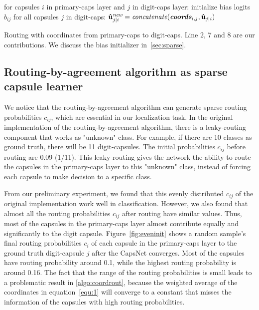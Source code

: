\documentclass{article}
\begin{document}
\begin{algorithm}
\SetAlgoLined
{}
 for capsules $i$ in primary-caps layer and $j$ in digit-caps layer: initialize bias logits $b_{ij}$ \;
 for all capsules $j$ in digit-caps: $\bold{\hat{u}}^{\small{\textit{new}}}_{j|i} = \textit{concatenate}(\textit{\textbf{coords}}_{i,j}, \bold{\hat{u}}_{j|i})$ \;
 \caption{Routing with coordinates from primary-caps to digit-caps. Line 2, 7 and 8 are our contributions. We discuss the bias initializer in~\autoref{sec:sparse}. \label{algo:coordrout}}
\end{algorithm}

\subsection{Routing-by-agreement algorithm as sparse capsule learner \label{sec:sparse}}
We notice that the routing-by-agreement algorithm can generate sparse routing probabilities $c_{ij}$, which are essential in our localization task. In the original implementation of the routing-by-agreement algorithm, there is a leaky-routing component that works as "unknown" class. For example, if there are 10 classes as ground truth, there will be 11 digit-capsules. The initial probabilities $c_{ij}$ before routing are 0.09 (1/11). This leaky-routing gives the network the ability to route the capsules in the primary-caps layer to this "unknown" class, instead of forcing each capsule to make decision to a specific class. 

From our preliminary experiment, we found that this evenly distributed $c_{ij}$ of the original implementation work well in classification. However, we also found that almost all the routing probabilities $c_{ij}$ after routing have similar values. Thus, most of the capsules in the primary-caps layer almost contribute equally and significantly to the digit capsule. Figure~\ref{fig:eveninit} shows a random sample's final routing probabilities $c_{i}$ of each capsule in the primary-caps layer to the ground truth digit-capsule $j$ after the CapsNet converges. Most of the capsules have routing probability around 0.1, while the highest routing probability is around 0.16. The fact that the range of the routing probabilities is small leads to a problematic result in \autoref{algo:coordrout}, because the weighted average of the coordinates in equation~\ref{equ:1} will converge to a constant that misses the information of the capsules with high routing probabilities. 
\end{document}
